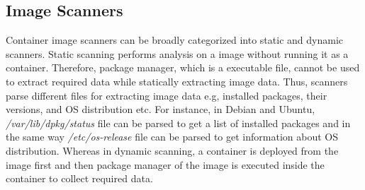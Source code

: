 \documentclass[a4paper,num-refs]{oup-contemporary}
\begin{document}
%
%
%
%


\subsection{Image Scanners}

Container image scanners can be broadly categorized into static and dynamic
scanners. Static scanning performs analysis on a image without running it
as a container. Therefore, package manager, which is a executable file,
cannot be used to extract required data while statically extracting image data.
Thus, scanners parse different files for extracting image data e.g, installed packages, their versions,
and OS distribution etc. For instance, in Debian and Ubuntu, \textit{/var/lib/dpkg/status} file
can be parsed to get a list of installed packages and in the same way \textit{/etc/os-release} file can be
parsed to get information about OS distribution.
Whereas in dynamic scanning, a container is deployed from the image first and then
package manager of the image is executed inside the container to collect required data.
\end{document}
